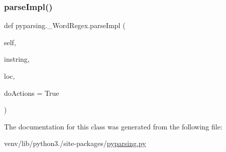 \subsubsection{\texorpdfstring{parse\+Impl()}{parseImpl()}}
{\footnotesize\ttfamily def pyparsing.\+\_\+\+Word\+Regex.\+parse\+Impl (\begin{DoxyParamCaption}\item[{}]{self,  }\item[{}]{instring,  }\item[{}]{loc,  }\item[{}]{do\+Actions = {\ttfamily True} }\end{DoxyParamCaption})}



The documentation for this class was generated from the following file\+:\begin{DoxyCompactItemize}
\item 
venv/lib/python3./site-\/packages/\hyperlink{pyparsing_8py}{pyparsing.\+py}\end{DoxyCompactItemize}
